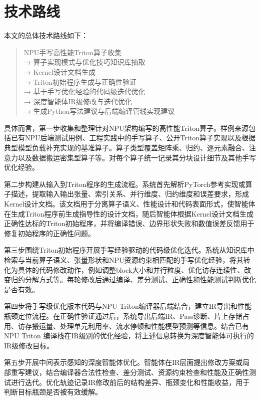 \section{技术路线}

本文的总体技术路线如下：

\begin{quote}
NPU手写高性能Triton算子收集\\
→ 算子实现模式与优化技巧知识库抽取\\
→ Kernel设计文档生成\\
→ Triton初始程序生成与正确性验证\\
→ 基于手写优化经验的代码级迭代优化\\
→ 深度智能体IR级修改与迭代优化\\
→ 生成Python写法建议与后端编译管线实现建议
\end{quote}

具体而言，第一步收集和整理针对NPU架构编写的高性能Triton算子。样例来源包括已有NPU后端测试用例、工程实践中的手写算子、公开Triton算子实现以及根据典型模型负载补充实现的基准算子。算子类型覆盖矩阵乘、归约、逐元素融合、注意力以及数据搬运密集型算子等。对每个算子统一记录其分块设计细节及其他手写优化经验。

第二步构建从输入到Triton程序的生成流程。系统首先解析PyTorch参考实现或算子描述，提取输入输出张量、索引关系、并行维度、归约维度和误差要求，形成Kernel设计文档。该文档用于分离算子语义、性能设计和代码表面形式，使智能体在生成Triton程序前生成指导性的设计文档，随后智能体根据Kernel设计文档生成正确性达标的Triton初始程序，并将编译错误、边界形状失败和数值误差反馈用于修复初始程序的正确性问题。

第三步围绕Triton初始程序开展手写经验驱动的代码级优化迭代。系统从知识库中检索与当前算子语义、张量形状和NPU资源约束相匹配的手写优化经验，将其转化为具体的代码修改动作，例如调整block大小和并行粒度、优化访存连续性、改变归约分解方式等。每轮修改后通过编译、差分测试、正确性和性能测试判断优化是否有效。

第四步将手写级优化版本代码与NPU Triton编译器后端结合，建立IR导出和性能瓶颈定位流程。在正确性验证通过后，系统导出后端IR、Pass诊断、片上存储占用、访存搬运量、处理单元利用率、流水停顿和性能模型预测等信息。结合已有 NPU Triton 编译栈在IR级别的优化经验，将上述信息转换为深度智能体可执行的IR级修改目标。

第五步开展中间表示感知的深度智能体优化。智能体在IR层面提出修改方案或局部重写建议，结合编译器合法性检查、差分测试、资源约束检查和性能及正确性测试进行迭代。优化轨迹记录IR修改前后的结构差异、瓶颈变化和性能收益，用于判断目标瓶颈是否被有效缓解。

